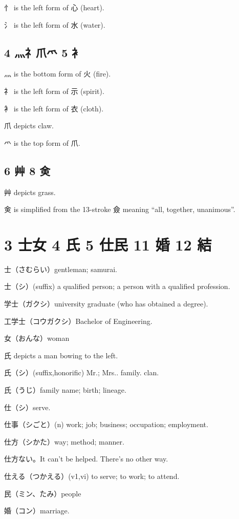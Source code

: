 忄 is the left form of 心 (heart).

氵 is the left form of 水 (water).

\subsection{4 灬礻爪爫 5 衤}

灬 is the bottom form of 火 (fire).

礻 is the left form of 示 (spirit).

衤 is the left form of 衣 (cloth).

爪 depicts claw.

爫 is the top form of 爪.

\subsection{6 艸 8 㑒}

艸 depicts grass.

㑒 is simplified from the 13-stroke 僉
meaning ``all, together, unanimous''.

\section{3 士女 4 氏 5 仕民 11 婚 12 結}

士（さむらい）gentleman; samurai.

士（シ）(suffix)
a qualified person;
a person with a qualified profession.

学士（ガクシ）university graduate (who has obtained a degree).

工学士（コウガクシ）Bachelor of Engineering.

女（おんな）woman

氏 depicts a man bowing to the left.

氏（シ）(suffix,honorific) Mr.; Mrs.. family. clan.

氏（うじ）family name; birth; lineage.

仕（シ）serve.

仕事（シごと）(n) work; job; business; occupation; employment.

仕方（シかた）way; method; manner.

仕方ない。It can't be helped. There's no other way.

仕える（つかえる）(v1,vi) to serve; to work; to attend.

民（ミン、たみ）people

婚（コン）marriage.


